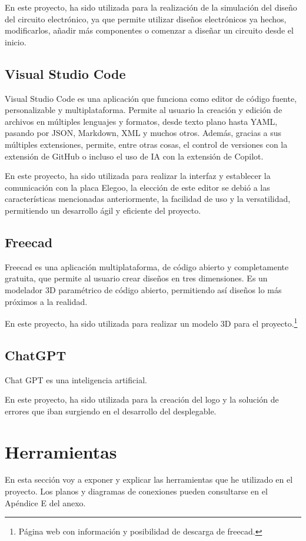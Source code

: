 En este proyecto, ha sido utilizada para la realización de la simulación del diseño del circuito electrónico, ya que permite utilizar diseños electrónicos ya hechos, modificarlos, añadir más componentes o comenzar a diseñar un circuito desde el inicio.
\subsection{Visual Studio Code}
Visual Studio Code es una aplicación que funciona como editor de código fuente, personalizable y multiplataforma.
Permite al usuario la creación y edición de archivos en múltiples lenguajes y formatos, desde texto plano hasta YAML, pasando por JSON, Markdown, XML y muchos otros. Además, gracias a sus múltiples extensiones, permite, entre otras cosas, el control de versiones con la extensión de GitHub o incluso el uso de IA con la extensión de Copilot.

En este proyecto, ha sido utilizada para realizar la interfaz y establecer la comunicación con la placa Elegoo, la elección de este editor se debió a las características mencionadas anteriormente, la facilidad de uso y la versatilidad, permitiendo un desarrollo ágil y eficiente del proyecto.
\subsection{Freecad}
Freecad es una aplicación multiplataforma, de código abierto y completamente gratuita, que permite al usuario crear diseños en tres dimensiones.
Es un modelador 3D paramétrico de código abierto, permitiendo así diseños lo más próximos a la realidad.

En este proyecto, ha sido utilizada para realizar un modelo 3D para el proyecto.\cite{freecad}\footnote{Página web con información y posibilidad de descarga de freecad\cite{freecad}.} 
\subsection{ChatGPT}
Chat GPT es una inteligencia artificial.

En este proyecto, ha sido utilizada para la creación del logo y la solución de errores que iban surgiendo en el desarrollo del desplegable.
\section{Herramientas}
En esta sección voy a exponer y explicar las herramientas que he utilizado en el proyecto. Los planos y diagramas de conexiones pueden consultarse en el Apéndice E del anexo.
